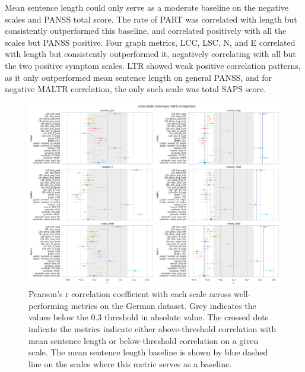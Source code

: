 Mean sentence length could only serve as a moderate baseline on the negative scales and PANSS total score. The rate of PART was correlated with length but consistently outperformed this baseline, and correlated positively with all the scales but PANSS positive. Four graph metrics, LCC, LSC, N, and E correlated with length but consistently outperformed it, negatively correlating with all but the two positive symptom scales. LTR showed weak positive correlation patterns, as it only outperformed mean sentence length on general PANSS, and for negative MALTR correlation, the only such scale was total SAPS score. 

\begin{figure}[ht!]
    \includegraphics[width=1.1\textwidth, center]{Figures/chapter_4/compare/de_compare_r.png} 
\captionsetup{width=\textwidth}
\caption[Metric Comparison: German, Psychiatric Scales]{\label{fig:results:comp:de} Pearson's r correlation coefficient with each scale across well-performing metrics on the German dataset. Grey indicates the values below the 0.3 threshold in absolute value. The crossed dots indicate the metrics indicate either above-threshold correlation with mean sentence length or below-threshold correlation on a given scale. The mean sentence length baseline is shown by blue dashed line on the scales where this metric serves as a baseline. }
\end{figure}

